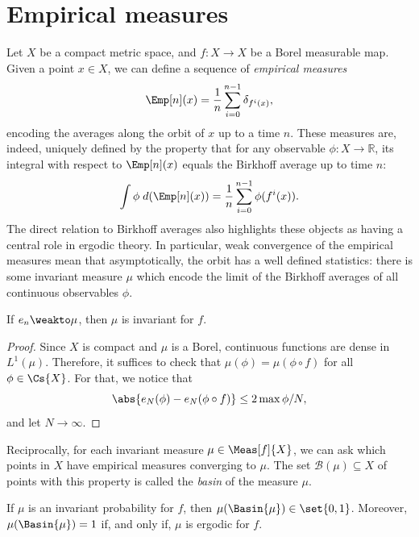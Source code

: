 \documentclass[../main]{subfiles}
\begin{document}
\section{Empirical measures}\label{sec:empirical-measures}
Let \(X\) be a compact metric space, and \(f \colon X \to X\) be a Borel measurable map. Given a point \(x \in X\), we can define a sequence of \emph{empirical measures}
\[\Emp[n](x) = \frac{1}{n} \sum_{i = 0}^{n - 1} \delta_{f^i(x)},\]
encoding the averages along the orbit of \(x\) up to a time \(n\). These measures are, indeed, uniquely defined by the property that for any observable \(\phi \colon X \to \mathbb{R}\), its integral with respect to \(\Emp[n](x)\) equals the Birkhoff average up to time \(n\): 
\begin{equation*}
  \int \phi \;d(\Emp[n](x)) = \frac{1}{n}\sum_{i = 0}^{n - 1} \phi(f^i(x)).
\end{equation*}
The direct relation to Birkhoff averages also highlights these objects as having a central role in ergodic theory. In particular, weak convergence of the empirical measures mean that asymptotically, the orbit has a well defined statistics: there is some invariant measure \(\mu\) which encode the limit of the Birkhoff averages of all continuous observables \(\phi\).

\begin{lemma}
  If \(e_n \weakto \mu\), then \(\mu\) is invariant for \(f\).
\end{lemma}

\begin{proof}
  Since \(X\) is compact and \(\mu\) is a Borel, continuous functions are dense in \(L^1(\mu)\). Therefore, it suffices to check that \(\mu(\phi) = \mu(\phi \circ f)\) for all \(\phi \in \Cs{X}\). For that, we notice that
  \begin{equation*}
    \abs{e_N(\phi) - e_N(\phi \circ f)} \le {2\max \phi}/{N},
  \end{equation*}
  and let \(N \to \infty\).
\end{proof}

Reciprocally, for each invariant measure \(\mu \in \Meas[f]{X}\), we can ask which points in \(X\) have empirical measures converging to \(\mu\). The set \(\mathcal{B}(\mu) \subseteq X\) of points with this property is called the \emph{basin} of the measure \(\mu\).

\begin{lemma}\label{lem:erg-iff-basin-full-meas}
  If \(\mu\) is an invariant probability for \(f\), then \(\mu(\Basin{\mu}) \in \set{0,1}\). Moreover, \(\mu(\Basin{\mu}) = 1\) if, and only if, \(\mu\) is ergodic for \(f\).
\end{lemma}
\end{document}

